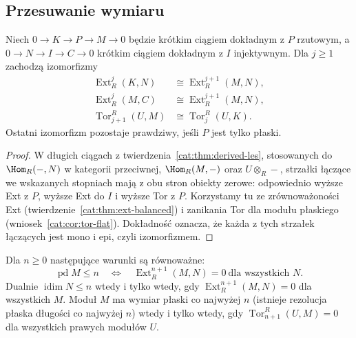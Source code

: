 \subsection{Przesuwanie wymiaru}
\begin{twierdzenie}\label{cat:thm:dimension-shifting}
Niech $0\to K\to P\to M\to0$ będzie krótkim ciągiem dokładnym z $P$ rzutowym, a $0\to N\to I\to C\to0$ krótkim ciągiem dokładnym z $I$ injektywnym. Dla $j\ge1$ zachodzą izomorfizmy
\[
\begin{aligned}
 \operatorname{Ext}_R^j(K,N)&\cong\operatorname{Ext}_R^{j+1}(M,N),\\
 \operatorname{Ext}_R^j(M,C)&\cong\operatorname{Ext}_R^{j+1}(M,N),\\
 \operatorname{Tor}_{j+1}^R(U,M)&\cong\operatorname{Tor}_j^R(U,K).
\end{aligned}
\]
Ostatni izomorfizm pozostaje prawdziwy, jeśli $P$ jest tylko płaski.
\end{twierdzenie}
\begin{proof}
W długich ciągach z twierdzenia~\ref{cat:thm:derived-les}, stosowanych do $\Hom_R(-,N)$ w kategorii przeciwnej, $\Hom_R(M,-)$ oraz $U\otimes_R-$, strzałki łączące we wskazanych stopniach mają z obu stron obiekty zerowe: odpowiednio wyższe Ext z $P$, wyższe Ext do $I$ i wyższe Tor z $P$. Korzystamy tu ze zrównoważoności Ext (twierdzenie~\ref{cat:thm:ext-balanced}) i zanikania Tor dla modułu płaskiego (wniosek~\ref{cat:cor:tor-flat}). Dokładność oznacza, że każda z tych strzałek łączących jest mono i epi, czyli izomorfizmem.
\end{proof}
\begin{twierdzenie}\label{cat:thm:dimension-vanishing}
Dla $n\ge0$ następujące warunki są równoważne:
\[
 \operatorname{pd}M\le n
 \quad\Longleftrightarrow\quad
 \operatorname{Ext}_R^{n+1}(M,N)=0\ \text{dla wszystkich }N.
\]
Dualnie $\operatorname{idim}N\le n$ wtedy i tylko wtedy, gdy $\operatorname{Ext}_R^{n+1}(M,N)=0$ dla wszystkich $M$. Moduł $M$ ma wymiar płaski co najwyżej $n$ (istnieje rezolucja płaska długości co najwyżej $n$) wtedy i tylko wtedy, gdy $\operatorname{Tor}_{n+1}^R(U,M)=0$ dla wszystkich prawych modułów $U$.
\end{twierdzenie}
